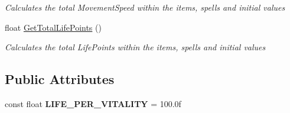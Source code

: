 \begin{DoxyCompactItemize}
\begin{DoxyCompactList}\small\item\em Calculates the total Movement\+Speed within the items, spells and initial values \end{DoxyCompactList}\item 
float \hyperlink{class_hel_project_1_1_features_1_1_feature_manager_a226f7b884b8de2556e8b12fec879d927}{Get\+Total\+Life\+Points} ()
\begin{DoxyCompactList}\small\item\em Calculates the total Life\+Points within the items, spells and initial values \end{DoxyCompactList}\end{DoxyCompactItemize}
\subsection*{Public Attributes}
\begin{DoxyCompactItemize}
\item 
\hypertarget{class_hel_project_1_1_features_1_1_feature_manager_a82ddccda10f8361c1ba5b386037a427e}{}const float {\bfseries L\+I\+F\+E\+\_\+\+P\+E\+R\+\_\+\+V\+I\+T\+A\+L\+I\+T\+Y} = 100.\+0f\label{class_hel_project_1_1_features_1_1_feature_manager_a82ddccda10f8361c1ba5b386037a427e}

\end{DoxyCompactItemize}
